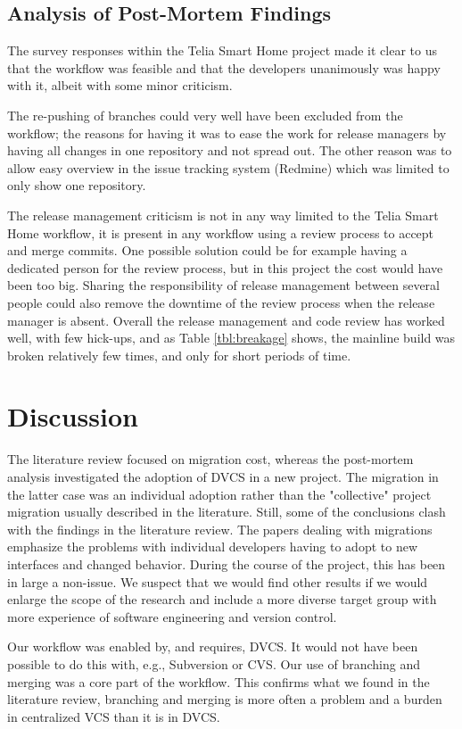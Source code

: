 \documentclass{llncs}
\begin{document}
\subsection{Analysis of Post-Mortem Findings}
The survey responses within the Telia Smart Home project made it clear
to us that the workflow was feasible and that the developers
unanimously was happy with it, albeit with some minor criticism.

The re-pushing of branches could very well have been excluded from the
workflow; the reasons for having it was to ease the work for release
managers by having all changes in one repository and not spread
out. The other reason was to allow easy overview in the issue tracking
system (Redmine) which was limited to only show one repository.

The release management criticism is not in any way limited to the
Telia Smart Home workflow, it is present in any workflow using a
review process to accept and merge commits. One possible solution
could be for example having a dedicated person for the review process,
but in this project the cost would have been too big. Sharing the
responsibility of release management between several people could also
remove the downtime of the review process when the release manager is
absent. Overall the release management and code review has worked
well, with few hick-ups, and as Table \ref{tbl:breakage} shows, the
mainline build was broken relatively few times, and only for short
periods of time.

\section{Discussion}

The literature review focused on migration cost, whereas the
post-mortem analysis investigated the adoption of DVCS in a new
project. The migration in the latter case was an individual adoption
rather than the "collective" project migration usually described in
the literature. Still, some of the conclusions clash with the findings
in the literature review. The papers dealing with migrations
emphasize the problems with individual developers having to adopt to
new interfaces and changed behavior. During the course of the project,
this has been in large a non-issue. We suspect that we would find
other results if we would enlarge the scope of the research and
include a more diverse target group with more experience of software
engineering and version control.

Our workflow was enabled by, and requires, DVCS. It would not have
been possible to do this with, e.g., Subversion or CVS. Our use of
branching and merging was a core part of the workflow. This confirms
what we found in the literature review, branching and merging is more
often a problem and a burden in centralized VCS than it is in DVCS.
\end{document}
